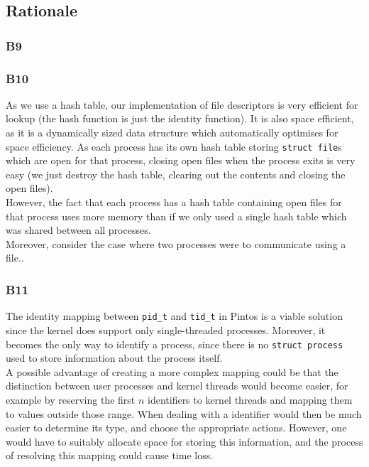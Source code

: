 \documentclass[a4wide, 11pt]{article}
\newcommand{\tx}{\texttt}
\begin{document}
\subsection{Rationale}
\subsubsection{B9}

\subsubsection{B10}

As we use a hash table, our implementation of file descriptors is very efficient for lookup (the hash function is just the identity function). It is also space efficient, as it is a dynamically sized data structure which automatically optimises for space efficiency. As each process has its own hash table storing \tx{struct file}s which are open for that process, closing open files when the process exits is very easy (we just destroy the hash table, clearing out the contents and closing the open files).
\\
However, the fact that each process has a hash table containing open files for that process uses more memory than if we only used a single hash table which was shared between all processes.\\
Moreover, consider the case where two processes were to communicate using a file..

\subsubsection{B11}
The identity mapping between \tx{pid\_t} and \tx{tid\_t} in Pintos is a viable solution since the kernel does support only single-threaded processes. Moreover, it becomes the only way to identify a process, since there is no \tx{struct process} used to store information about the process itself. 
\\ A possible advantage of creating a more complex mapping could be that the distinction between user processes and kernel threads would become easier, for example by reserving the first $n$ identifiers to kernel threads and mapping them to values outside those range. When dealing with a identifier would then be much easier to determine its type, and choose the appropriate actions. However, one would have to suitably allocate space for storing this information, and the process of resolving this mapping could cause time loss.  
\end{document}
